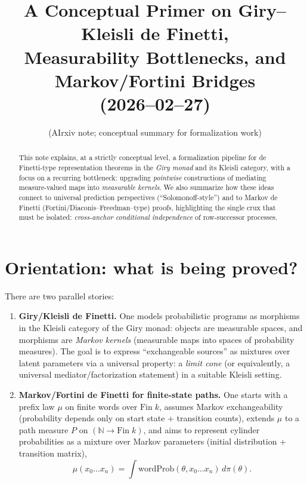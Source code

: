 \documentclass[11pt]{article}
\title{A Conceptual Primer on Giry--Kleisli de Finetti,\\ Measurability Bottlenecks, and Markov/Fortini Bridges\\(2026--02--27)}
\author{(AIrxiv note; conceptual summary for formalization work)}
\date{}
\newcommand{\NN}{\mathbb{N}}
\begin{document}
\maketitle

\begin{abstract}
This note explains, at a strictly conceptual level, a formalization pipeline for
de Finetti-type representation theorems in the \emph{Giry monad} and its Kleisli category,
with a focus on a recurring bottleneck: upgrading \emph{pointwise} constructions of mediating
measure-valued maps into \emph{measurable kernels}. We also summarize how these ideas connect
to universal prediction perspectives (``Solomonoff-style'') and to Markov de Finetti
(Fortini/Diaconis--Freedman--type) proofs, highlighting the single crux that must be isolated:
\emph{cross-anchor conditional independence} of row-successor processes.
\end{abstract}

\tableofcontents

\section{Orientation: what is being proved?}

There are two parallel stories:

\begin{enumerate}[label=(\alph*)]
\item \textbf{Giry/Kleisli de Finetti.}
One models probabilistic programs as morphisms in the Kleisli category of the Giry monad:
objects are measurable spaces, and morphisms are \emph{Markov kernels} (measurable maps into
spaces of probability measures). The goal is to express ``exchangeable sources'' as mixtures
over latent parameters via a universal property: a \emph{limit cone} (or equivalently, a
universal mediator/factorization statement) in a suitable Kleisli setting.

\item \textbf{Markov/Fortini de Finetti for finite-state paths.}
One starts with a prefix law $\mu$ on finite words over $\mathrm{Fin}\;k$,
assumes Markov exchangeability (probability depends only on start state + transition counts),
extends $\mu$ to a path measure $P$ on $(\NN \to \mathrm{Fin}\;k)$, and aims to represent
cylinder probabilities as a mixture over Markov parameters (initial distribution + transition matrix),
\[
\mu(x_0\ldots x_n)=\int \mathrm{wordProb}(\theta, x_0\ldots x_n)\,d\pi(\theta).
\]
\end{enumerate}
\end{document}
